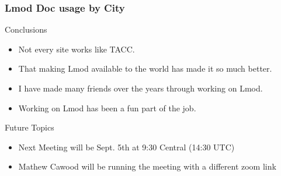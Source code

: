 \documentclass{beamer}
\begin{document}
\begin{frame}[fragile]
    \frametitle{Lmod Doc usage by City}
\end{frame}

\begin{frame}{Conclusions}
  \begin{itemize}
    \item Not every site works like TACC.
    \item That making Lmod available to the world has made it so much
      better.
    \item I have made many friends over the years through working on Lmod.
    \item Working on Lmod has been a fun part of the job.
  \end{itemize}
\end{frame}


\begin{frame}{Future Topics}
  \begin{itemize}
    \item Next Meeting will be Sept. 5th at 9:30 Central (14:30 UTC)
    \item Mathew Cawood will be running the meeting with a different
      zoom link
  \end{itemize}
\end{frame}
\end{document}
